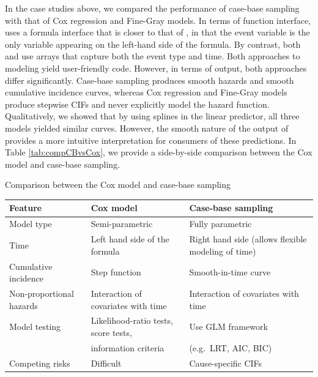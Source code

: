 In the case studies above, we compared the performance of case-base
sampling with that of Cox regression and Fine-Gray models. In terms of
function interface,  uses a formula interface that is
closer to that of , in that the event variable is the only
variable appearing on the left-hand side of the formula. By contrast,
both  and  use arrays
that capture both the event type and time. Both approaches to modeling
yield user-friendly code. However, in terms of output, both approaches
differ significantly. Case-base sampling produces smooth hazards and
smooth cumulative incidence curves, whereas Cox regression and Fine-Gray
models produce stepwise CIFs and never explicitly model the hazard
function. Qualitatively, we showed that by using splines in the linear
predictor, all three models yielded similar curves. However, the smooth
nature of the output of  provides a more intuitive
interpretation for consumers of these predictions. In Table
\ref{tab:compCBvsCox}, we provide a side-by-side comparison between the
Cox model and case-base sampling.

\begin{widetable}
\caption{\label{tab:compCBvsCox}Comparison between the Cox model and case-base sampling}
\centering
\begin{tabular}[t]{llp{5cm}}
\toprule
Feature & Cox model & Case-base sampling\\
\toprule
Model type & Semi-parametric & Fully parametric\\\midrule
Time & Left hand side of the formula & Right hand side (allows flexible modeling of time)\\\midrule
Cumulative incidence & Step function & Smooth-in-time curve\\\midrule
Non-proportional hazards & Interaction of covariates with time & Interaction of covariates with time\\\midrule
Model testing & Likelihood-ratio tests, score tests, & Use GLM framework\\
 & information criteria & (e.g.\ LRT, AIC, BIC)\\\midrule
\addlinespace
Competing risks & Difficult & Cause-specific CIFs\\
\bottomrule
\end{tabular}
\end{widetable}

